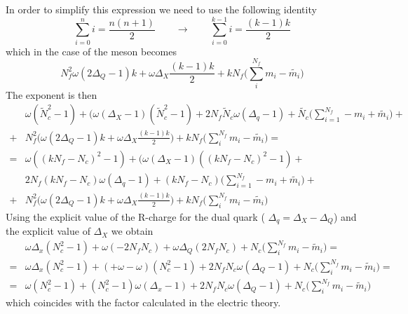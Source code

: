 \begin{appendices}
In order to simplify this expression we need to use the following identity
\begin{equation}
 \sum_{i=0}^{n} i =  \frac{n ( n + 1 )}{2} \qquad \longrightarrow 	\qquad  \sum_{i=0}^{k-1} i =  \frac{ (k-1)k}{2}
\end{equation}
which in the case of the meson becomes
\begin{equation}
N_f^2 \omega ( 2 \Delta_Q - 1) k + \omega \Delta_X  \frac{ ( k-1) k }{2} + k N_f \big( \sum_i^{N_f} m_i - \tilde{m_i} \big)
\end{equation}
The exponent is then
\begin{equation}
\begin{aligned}
&  \omega (\tilde {N}_c^2  - 1)  + ( \omega (\Delta_X - 1)( \tilde N_c^2 - 1) +  2   N_f \tilde N_c \omega (\Delta_q - 1 ) +  \tilde{N_c} \big( \sum_{i=1}^{N_f} - m_i + \tilde{m_i} \big) +\\
+ &  N_f^2 \big(   \omega (2 \Delta_Q -1) k + \omega \Delta_X  \frac{ ( k-1) k }{2} \big) + k N_f \big( \sum_i^{N_f} m_i - \tilde{m_i} \big)= \\
=&  \omega ( (k N_f -N_c)^2 - 1) + ( \omega (\Delta_X - 1)((k N_f -N_c)^2 - 1) + \\
& 2   N_f (k N_f -N_c) \omega (\Delta_q - 1 ) +  (k N_f -N_c) \big( \sum_{i=1}^{N_f} - m_i + \tilde{m_i} \big)  +\\
+&  N_f^2 \big(  \omega ( 2 \Delta_Q -1) k + \omega \Delta_X  \frac{ ( k-1) k }{2} \big) +  k N_f \big( \sum_i^{N_f} m_i - \tilde{m_i} \big)
\end{aligned}
\end{equation}
Using the explicit value of the R-charge for the dual quark ( $\Delta_q = \Delta_X -\Delta_Q $) and the explicit value of $\Delta_X$ we obtain
\begin{equation}
\begin{aligned}
 & \omega \Delta_x ( N_c^2 - 1) + \omega ( - 2 N_f N_c  ) + \omega \Delta_Q ( 2 N_f N_c )  + N_c \big( \sum_i^{N_f} m_i - \tilde m_i  \big) =  \\
 = & \omega \Delta_x ( N_c^2 - 1) + ( + \omega - \omega)  ( N_c^2 -1 ) + 2 N_f N_c  \omega ( \Delta_Q -1 )  +  N_c \big( \sum_i^{N_f} m_i - \tilde m_i  \big) = \\
 = &\omega ( N_c^2 -1 ) + ( N_c^2 - 1) \omega (\Delta_x  - 1 ) + 2 N_f N_c  \omega ( \Delta_Q -1 )  + N_c \big( \sum_i^{N_f} m_i - \tilde m_i  \big)
\end{aligned}
\end{equation}
which coincides with the factor calculated in the electric theory.


\end{appendices}

